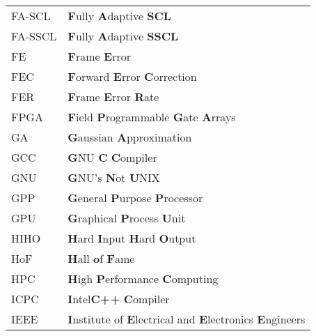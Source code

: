 \begin{center}
\begin{longtable}{ p{}  p{} }
		FA-SCL  & \textbf{F}ully \textbf{A}daptive \textbf{SCL}                                                                   \\
		FA-SSCL & \textbf{F}ully \textbf{A}daptive \textbf{SSCL}                                                                  \\
		FE      & \textbf{F}rame \textbf{E}rror                                                                                   \\
		FEC     & \textbf{F}orward \textbf{E}rror \textbf{C}orrection                                                             \\
		FER     & \textbf{F}rame \textbf{E}rror \textbf{R}ate                                                                     \\
		FPGA    & \textbf{F}ield \textbf{P}rogrammable \textbf{G}ate \textbf{A}rrays                                              \\
		GA      & \textbf{G}aussian \textbf{A}pproximation                                                                        \\
		GCC     & \textbf{G}NU \textbf{C} \textbf{C}ompiler                                                                       \\
		GNU     & \textbf{G}NU’s \textbf{N}ot \textbf{U}NIX                                                                       \\
		GPP     & \textbf{G}eneral \textbf{P}urpose \textbf{P}rocessor                                                            \\
		GPU     & \textbf{G}raphical \textbf{P}rocess \textbf{U}nit                                                               \\
		HIHO    & \textbf{H}ard \textbf{I}nput \textbf{H}ard \textbf{O}utput                                                      \\
		HoF     & \textbf{H}all \textbf{o}f \textbf{F}ame                                                                         \\
		HPC     & \textbf{H}igh \textbf{P}erformance \textbf{C}omputing                                                           \\
		ICPC    & \textbf{I}ntel\R \textbf{C++} \textbf{C}ompiler                                                                 \\
		IEEE    & \textbf{I}nstitute of \textbf{E}lectrical and \textbf{E}lectronics \textbf{E}ngineers                           \\

\end{longtable}
\end{center}
